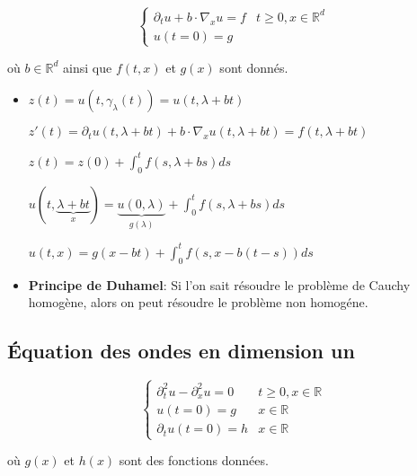 \documentclass[10pt,a4paper,oneside]{article}
\begin{document}
\[ \begin{cases}
\partial_t u + b \cdot \nabla_x u = f & t \geq 0, x \in \mathbb{R}^d \\
u(t = 0) = g
\end{cases} \]

où $b \in \mathbb{R}^d$ ainsi que $f(t,x)$ et $g(x)$ sont donnés.

\begin{itemize}
\item
$z(t) = u(t,\gamma_{\lambda}(t)) = u(t,\lambda + bt)$

$z'(t) = \partial_t u(t,\lambda + bt) + b \cdot \nabla_x u(t,\lambda + bt) = f(t,\lambda + bt)$

$z(t) = z(0) + \int_{0}^{t} f(s,\lambda + bs) ds$

$u(t,\underbrace{\lambda + bt}_{x}) = \underbrace{u(0,\lambda)}_{g(\lambda)} + \int_{0}^{t} f(s,\lambda + bs) ds$

$\boxed{u(t,x) = g(x - bt) + \int_{0}^{t} f(s,x -b(t - s)) ds}$

\item
\textbf{Principe de Duhamel}: Si l'on sait résoudre le problème de Cauchy homogène, alors on peut résoudre le problème non homogéne.

\end{itemize}

\subsection{Équation des ondes en dimension un}

\[ \begin{cases}
\partial^2_t u - \partial^2_x u = 0 & t \geq 0, x \in \mathbb{R} \\
u(t = 0) = g & x \in \mathbb{R} \\
\partial_t u(t = 0) = h & x \in \mathbb{R}
\end{cases} \]

où $g(x)$ et $h(x)$ sont des fonctions données.
\end{document}
